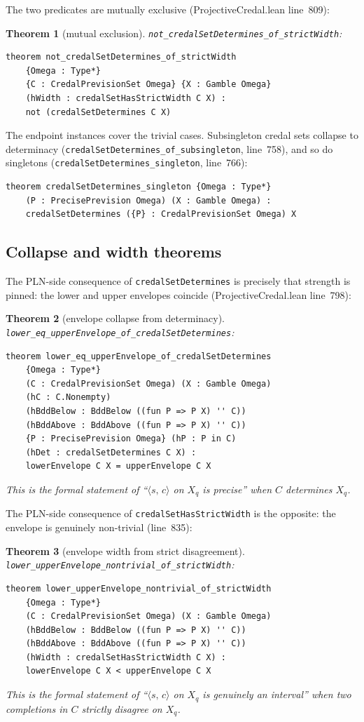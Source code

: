 \documentclass[]{article}
\newtheorem{theorem}{Theorem}
\newcommand{\lid}[1]{{\ttfamily\nolinkurl{#1}}}
\newcommand{\STV}[2]{\langle #1,\, #2 \rangle}
\begin{document}
The two predicates are mutually exclusive (ProjectiveCredal.lean line~809):
\begin{theorem}[mutual exclusion]\label{thm:mutex}
\lid{not\_credalSetDetermines\_of\_strictWidth}:
\begin{lstlisting}
theorem not_credalSetDetermines_of_strictWidth
    {Omega : Type*}
    {C : CredalPrevisionSet Omega} {X : Gamble Omega}
    (hWidth : credalSetHasStrictWidth C X) :
    not (credalSetDetermines C X)
\end{lstlisting}
\end{theorem}

The endpoint instances cover the trivial cases. Subsingleton credal sets
collapse to determinacy
(\lid{credalSetDetermines\_of\_subsingleton}, line~758), and so do
singletons (\lid{credalSetDetermines\_singleton}, line~766):
\begin{lstlisting}
theorem credalSetDetermines_singleton {Omega : Type*}
    (P : PrecisePrevision Omega) (X : Gamble Omega) :
    credalSetDetermines ({P} : CredalPrevisionSet Omega) X
\end{lstlisting}

\subsection{Collapse and width theorems}

The PLN-side consequence of \lid{credalSetDetermines} is precisely
that strength is pinned: the lower and upper envelopes coincide
(ProjectiveCredal.lean line~798):
\begin{theorem}[envelope collapse from determinacy]\label{thm:collapse}
\lid{lower\_eq\_upperEnvelope\_of\_credalSetDetermines}:
\begin{lstlisting}
theorem lower_eq_upperEnvelope_of_credalSetDetermines
    {Omega : Type*}
    (C : CredalPrevisionSet Omega) (X : Gamble Omega)
    (hC : C.Nonempty)
    (hBddBelow : BddBelow ((fun P => P X) '' C))
    (hBddAbove : BddAbove ((fun P => P X) '' C))
    {P : PrecisePrevision Omega} (hP : P in C)
    (hDet : credalSetDetermines C X) :
    lowerEnvelope C X = upperEnvelope C X
\end{lstlisting}
This is the formal statement of ``$\STV{s}{c}$ on $X_q$ is precise''
when $C$ determines $X_q$.
\end{theorem}

The PLN-side consequence of \lid{credalSetHasStrictWidth} is the opposite:
the envelope is genuinely non-trivial (line~835):
\begin{theorem}[envelope width from strict disagreement]\label{thm:width}
\lid{lower\_upperEnvelope\_nontrivial\_of\_strictWidth}:
\begin{lstlisting}
theorem lower_upperEnvelope_nontrivial_of_strictWidth
    {Omega : Type*}
    (C : CredalPrevisionSet Omega) (X : Gamble Omega)
    (hBddBelow : BddBelow ((fun P => P X) '' C))
    (hBddAbove : BddAbove ((fun P => P X) '' C))
    (hWidth : credalSetHasStrictWidth C X) :
    lowerEnvelope C X < upperEnvelope C X
\end{lstlisting}
This is the formal statement of ``$\STV{s}{c}$ on $X_q$ is genuinely an
interval'' when two completions in $C$ strictly disagree on $X_q$.
\end{theorem}
\end{document}

